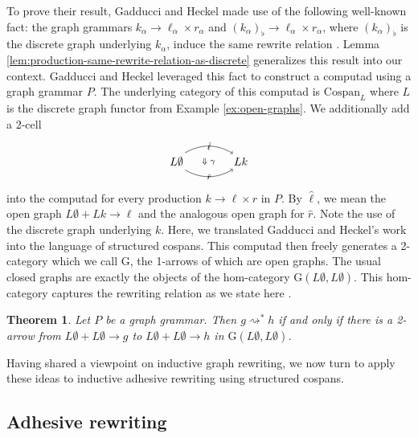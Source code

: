 \documentclass{amsart}
\newcommand{\Csp}{\cat{Cospan}}
\newcommand{\cat}[1]{\mathrm{#1}}
\newcommand{\deriv}[2]{#1 \rightsquigarrow^\ast #2}
\newcommand{\csp}[3]{#1 + #3 \to #2}
\newtheorem{theorem}{Theorem}[section]
\theoremstyle{remark}
\theoremstyle{definition}
\begin{document}
To prove their result, Gadducci and Heckel made use of the following
well-known fact: the graph grammars
%
$ { k_\alpha \to \ell_\alpha \times r_\alpha } $
%
and
%
$ { ( k_\alpha )_{\flat}  \to \ell_\alpha \times r_\alpha } $,
% 
where $ ( k_\alpha )_{\flat} $ is the discrete graph underlying
$ k_\alpha $, induce the same rewrite relation
\cite[Prop.~3.3]{Ehrig_GraphGram}. Lemma
\ref{lem:production-same-rewrite-relation-as-discrete} generalizes
this result into our context.  Gadducci and Heckel leveraged this fact
to construct a computad using a graph grammar $ P $. The underlying
category of this computad is $ \Csp_L $ where $ L $ is the discrete
graph functor from Example \ref{ex:open-graphs}. We additionally add a
2-cell
%
\[
  \begin{tikzpicture}
    \node (1) at (0,0) {$ L \emptyset $};
    \node (2) at (2,0) {$ Lk $};
    \node (3) at (1,0) {\scriptsize{$ \Downarrow \gamma $}};
    \draw [->, bend left] (1.45) to node [] {\scriptsize{$ \hat{\ell} $}} (2.135);
    \draw [->, bend right] (1.-45) to node [] {\scriptsize{$ \hat{r} $}} (2.-135);
  \end{tikzpicture}
\]
% 
into the computad for every production $ k \to \ell \times r $ in $ P
$. By $ \hat{\ell} $, we mean the open graph
%
\(
  \csp{L \emptyset}{\ell}{Lk}
\)
% 
and the analogous open graph for $ \hat{r} $.  Note the use of the
discrete graph underlying $ k $.  Here, we translated Gadducci and
Heckel's work into the language of structured cospans.  This computad
then freely generates a 2-category which we call $ \cat{G} $, the
1-arrows of which are open graphs. The usual closed graphs are exactly
the objects of the hom-category
$ \cat{G}( L \emptyset , L \emptyset ) $. This hom-category captures
the rewriting relation as we state here \cite[Thm.~23]{Gadd_IndGraphTran}.

\begin{theorem}
  Let $ P $ be a graph grammar. Then $ \deriv{g}{h} $ if and only
  if there is a 2-arrow from
  \(
    \csp{L \emptyset}{g}{L \emptyset}
  \)
  to
  \(
    \csp{L \emptyset}{h}{L \emptyset}
  \)
  in $ \cat{G} ( L \emptyset , L \emptyset ) $.  
\end{theorem}

Having shared a viewpoint on inductive graph rewriting, we now turn
to apply these ideas to inductive adhesive rewriting using structured cospans.


\subsection{Adhesive rewriting}
\label{sec:Adhesive-Rewriting}
\end{document}
